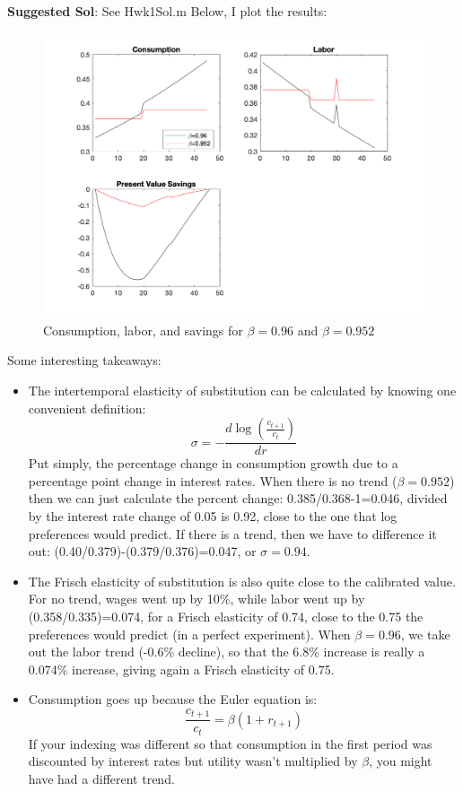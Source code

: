 \documentclass[11pt]{article}
\begin{document}
\textbf{Suggested Sol}: See Hwk1Sol.m
Below, I plot the results:
\begin{figure}[ht!]
\centering
\includegraphics[scale=0.5]{Figure1.png}
\caption{Consumption, labor, and savings for $\beta=0.96$ and $\beta=0.952$}
\end{figure}
Some interesting takeaways:
\begin{itemize}
\item The intertemporal elasticity of substitution can be calculated by knowing one convenient definition:
$$\sigma=-\frac{d \log\left(\frac{c_{t+1}}{c_t}\right)}{dr}$$
Put simply, the percentage change in consumption growth due to a percentage point change in interest rates.  When there is no trend ($\beta=0.952$) then we can just calculate the percent change: 0.385/0.368-1=0.046, divided by the interest rate change of 0.05 is 0.92, close to the one that log preferences would predict.  If there is a trend, then we have to difference it out:  (0.40/0.379)-(0.379/0.376)=0.047, or $\sigma=0.94$.  
\item The Frisch elasticity of substitution is also quite close to the calibrated value.  For no trend, wages went up by 10\%, while labor went up by (0.358/0.335)=0.074, for a Frisch elasticity of 0.74, close to the 0.75 the preferences would predict (in a perfect experiment).  When $\beta=0.96$, we take out the labor trend (-0.6\% decline), so that the 6.8\% increase is really a 0.074\% increase, giving again a Frisch elasticity of 0.75.
\item Consumption goes up because the Euler equation is:
$$\frac{c_{t+1}}{c_{t}}=\beta(1+r_{t+1})$$
If your indexing was different so that consumption in the first period was discounted by interest rates but utility wasn't multiplied by $\beta$, you might have had a different trend.
\end{itemize}
\end{document}
